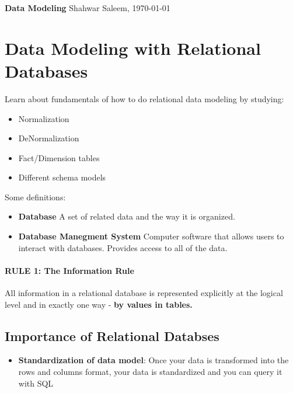 \documentclass[
	paper=a4,%
	pagesize,%
	8pt, fleqn,%
	headings=small,%
	notitlepage,%
	parskip=never]%
	{scrreprt}
\newcommand{\mytitle}{Data Modeling}
\newcommand{\myauthor}{Shahwar Saleem}
\begin{document}
\begin{multicols*}{3}

{\bfseries\sffamily\LARGE\mytitle} \vspace{0.35em}  \hfill \myauthor, \today \vspace{0.5em}



\hfill

\chapter{Data Modeling with Relational Databases}
Learn about fundamentals of how to do relational data modeling by studying:
\begin{itemize}
\item Normalization
\item DeNormalization
\item Fact/Dimension tables
\item Different schema models
\end{itemize}

Some definitions:
\begin{itemize}
\item \textbf{Database} A set of related data and the way it is organized.
\item \textbf{Database Manegment System} Computer software that allows users to interact with databases. Provides access to all of the data.

\end{itemize}

\subsubsection*{RULE 1: The Information Rule}
All information in a relational database is represented explicitly at the logical level and in exactly one way - \textbf{by values in tables.}

\section{Importance of Relational Databses}
\begin{itemize}
\item \textbf{Standardization of data model}: Once your data is transformed into the rows and columns format, your data is standardized and you can query it with SQL


\end{itemize}
\end{multicols*}
\end{document}
